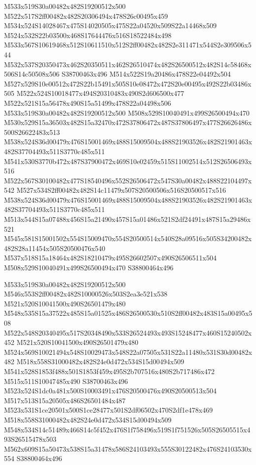 \documentclass{article}
\begin{document}
\begin{multicols}{2}
M533x519S30a00482x482S19200512x500 M522x517S2ff00482x482S20306494x478S26c00495x459 M534x524S14028467x475S14020505x475S22a04520x509S22a14468x509 M524x532S22b03500x468S17644476x516S18522484x498 M533x567S10619468x512S10611510x512S2ff00482x482S2e311471x544S2e309506x544 M532x537S20350473x462S20350511x462S26510474x482S26500512x482S14c58468x506S14c50508x506 S38700463x496 M514x522S19a20486x478S22e04492x504 M527x529S10e00512x472S22b15491x505S10e08472x472S20e00495x492S22b03486x505 M522x524S10018477x494S20310483x490S2d606500x477 M522x521S15a56478x490S15a51499x478S22a04498x506 M533x519S30a00482x482S19200512x500 M508x529S10040491x499S26500494x470 M530x529S15a36503x482S15a32470x472S37806472x487S37806497x477S26626486x500S26622483x513 M538x524S36d00479x476S15001469x488S15009504x488S21903526x482S21901463x482S37704493x511S3770c485x511 M541x530S3770b472x487S37900472x469S10e02459x515S11002514x512S26506493x516 M522x567S30100482x477S18540496x552S26506472x547S30a00482x488S22104497x542 M527x534S2ff00482x482S14c11479x507S20500506x516S20500517x516 M538x524S36d00479x476S15001469x488S15009504x488S21903526x482S21901463x482S37704493x511S3770c485x511 M513x544S15a07488x456S15a21490x457S15a01486x521S2df24491x487S15a29486x521 M545x581S15001502x554S15009470x554S20500514x540S28a09516x505S34200482x482S28a11454x505S20500476x540 M537x518S15a18464x482S18210479x495S26602507x490S26506511x504 M508x529S10040491x499S26500494x470 S38800464x496

M533x519S30a00482x482S19200512x500 M546x553S2ff00482x482S10000526x503S2ea3e521x538 M521x520S10041500x490S26501479x480 M548x535S15a37522x485S15a01525x486S26500530x510S2ff00482x483S15a00495x508 M522x548S20340495x517S20348490x533S26524493x493S15248477x460S15240502x452 M521x520S10041500x490S26501479x480 M524x569S10021494x548S10029473x548S22a07505x531S22a11480x531S30d00482x482 M518x558S31000482x482S24e0d472x534S15d00494x509 M541x528S1853f488x501S1853f459x495S2b707516x480S2b717486x472 M515x511S10047485x490 S38700463x496 M523x524S1dc0a481x500S10003491x476S20500476x490S20500513x504 M517x513S15a20505x486S26501484x487 M523x531S1ce20501x500S1ce28477x501S2df06502x470S2df1e478x469 M518x558S31000482x482S24e0d472x534S15d00494x509 M548x534S14c51489x466S14c5f452x476S1f758496x519S1f751526x505S26505515x493S26515478x503 M562x609S15a50473x538S15a31478x586S24103493x555S30122482x476S24103530x554 S38800464x496


\end{multicols}
\end{document}
